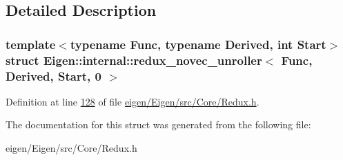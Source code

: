 \subsection{Detailed Description}
\subsubsection*{template$<$typename Func, typename Derived, int Start$>$\newline
struct Eigen\+::internal\+::redux\+\_\+novec\+\_\+unroller$<$ Func, Derived, Start, 0 $>$}



Definition at line \hyperlink{eigen_2_eigen_2src_2_core_2_redux_8h_source_l00128}{128} of file \hyperlink{eigen_2_eigen_2src_2_core_2_redux_8h_source}{eigen/\+Eigen/src/\+Core/\+Redux.\+h}.



The documentation for this struct was generated from the following file\+:\begin{DoxyCompactItemize}
\item 
eigen/\+Eigen/src/\+Core/\+Redux.\+h\end{DoxyCompactItemize}
